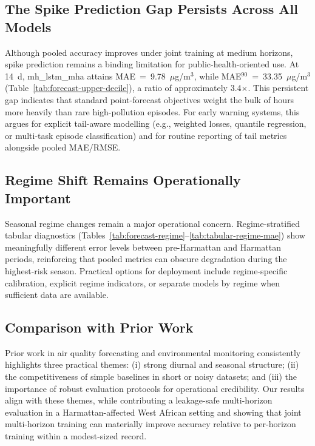 \documentclass[a4paper,fleqn]{cas-sc}
\begin{document}
\subsection{The Spike Prediction Gap Persists Across All Models}

Although pooled accuracy improves under joint training at medium horizons, spike prediction remains a binding limitation for public-health-oriented use. At 14~d, mh\_lstm\_mha attains MAE~=~9.78~$\mu$g/m$^3$, while MAE$^{90}$~=~33.35~$\mu$g/m$^3$ (Table~\ref{tab:forecast-upper-decile}), a ratio of approximately 3.4$\times$. This persistent gap indicates that standard point-forecast objectives weight the bulk of hours more heavily than rare high-pollution episodes. For early warning systems, this argues for explicit tail-aware modelling (e.g., weighted losses, quantile regression, or multi-task episode classification) and for routine reporting of tail metrics alongside pooled MAE/RMSE.

\subsection{Regime Shift Remains Operationally Important}

Seasonal regime changes remain a major operational concern. Regime-stratified tabular diagnostics (Tables~\ref{tab:forecast-regime}--\ref{tab:tabular-regime-mae}) show meaningfully different error levels between pre-Harmattan and Harmattan periods, reinforcing that pooled metrics can obscure degradation during the highest-risk season. Practical options for deployment include regime-specific calibration, explicit regime indicators, or separate models by regime when sufficient data are available.

\subsection{Comparison with Prior Work}

Prior work in air quality forecasting and environmental monitoring consistently highlights three practical themes: (i) strong diurnal and seasonal structure; (ii) the competitiveness of simple baselines in short or noisy datasets; and (iii) the importance of robust evaluation protocols for operational credibility. Our results align with these themes, while contributing a leakage-safe multi-horizon evaluation in a Harmattan-affected West African setting and showing that joint multi-horizon training can materially improve accuracy relative to per-horizon training within a modest-sized record.
\end{document}
